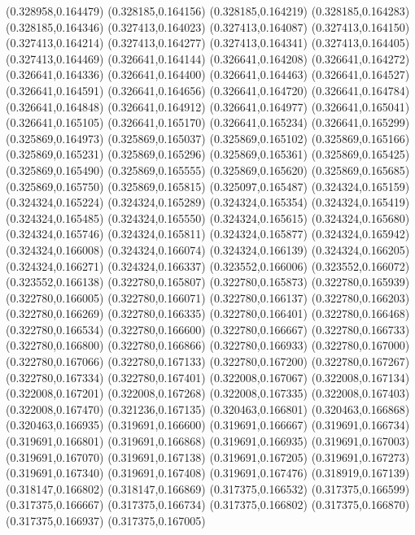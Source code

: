(0.328958,0.164479)
(0.328185,0.164156)
(0.328185,0.164219)
(0.328185,0.164283)
(0.328185,0.164346)
(0.327413,0.164023)
(0.327413,0.164087)
(0.327413,0.164150)
(0.327413,0.164214)
(0.327413,0.164277)
(0.327413,0.164341)
(0.327413,0.164405)
(0.327413,0.164469)
(0.326641,0.164144)
(0.326641,0.164208)
(0.326641,0.164272)
(0.326641,0.164336)
(0.326641,0.164400)
(0.326641,0.164463)
(0.326641,0.164527)
(0.326641,0.164591)
(0.326641,0.164656)
(0.326641,0.164720)
(0.326641,0.164784)
(0.326641,0.164848)
(0.326641,0.164912)
(0.326641,0.164977)
(0.326641,0.165041)
(0.326641,0.165105)
(0.326641,0.165170)
(0.326641,0.165234)
(0.326641,0.165299)
(0.325869,0.164973)
(0.325869,0.165037)
(0.325869,0.165102)
(0.325869,0.165166)
(0.325869,0.165231)
(0.325869,0.165296)
(0.325869,0.165361)
(0.325869,0.165425)
(0.325869,0.165490)
(0.325869,0.165555)
(0.325869,0.165620)
(0.325869,0.165685)
(0.325869,0.165750)
(0.325869,0.165815)
(0.325097,0.165487)
(0.324324,0.165159)
(0.324324,0.165224)
(0.324324,0.165289)
(0.324324,0.165354)
(0.324324,0.165419)
(0.324324,0.165485)
(0.324324,0.165550)
(0.324324,0.165615)
(0.324324,0.165680)
(0.324324,0.165746)
(0.324324,0.165811)
(0.324324,0.165877)
(0.324324,0.165942)
(0.324324,0.166008)
(0.324324,0.166074)
(0.324324,0.166139)
(0.324324,0.166205)
(0.324324,0.166271)
(0.324324,0.166337)
(0.323552,0.166006)
(0.323552,0.166072)
(0.323552,0.166138)
(0.322780,0.165807)
(0.322780,0.165873)
(0.322780,0.165939)
(0.322780,0.166005)
(0.322780,0.166071)
(0.322780,0.166137)
(0.322780,0.166203)
(0.322780,0.166269)
(0.322780,0.166335)
(0.322780,0.166401)
(0.322780,0.166468)
(0.322780,0.166534)
(0.322780,0.166600)
(0.322780,0.166667)
(0.322780,0.166733)
(0.322780,0.166800)
(0.322780,0.166866)
(0.322780,0.166933)
(0.322780,0.167000)
(0.322780,0.167066)
(0.322780,0.167133)
(0.322780,0.167200)
(0.322780,0.167267)
(0.322780,0.167334)
(0.322780,0.167401)
(0.322008,0.167067)
(0.322008,0.167134)
(0.322008,0.167201)
(0.322008,0.167268)
(0.322008,0.167335)
(0.322008,0.167403)
(0.322008,0.167470)
(0.321236,0.167135)
(0.320463,0.166801)
(0.320463,0.166868)
(0.320463,0.166935)
(0.319691,0.166600)
(0.319691,0.166667)
(0.319691,0.166734)
(0.319691,0.166801)
(0.319691,0.166868)
(0.319691,0.166935)
(0.319691,0.167003)
(0.319691,0.167070)
(0.319691,0.167138)
(0.319691,0.167205)
(0.319691,0.167273)
(0.319691,0.167340)
(0.319691,0.167408)
(0.319691,0.167476)
(0.318919,0.167139)
(0.318147,0.166802)
(0.318147,0.166869)
(0.317375,0.166532)
(0.317375,0.166599)
(0.317375,0.166667)
(0.317375,0.166734)
(0.317375,0.166802)
(0.317375,0.166870)
(0.317375,0.166937)
(0.317375,0.167005)
